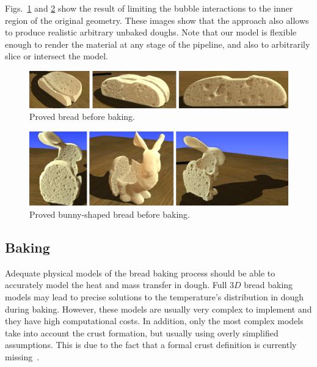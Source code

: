 Figs.~\ref{fg:proving} and \ref{fg:provingBunny} show the result of limiting the bubble interactions to the inner region of the original geometry.
These images show that the approach also allows to produce realistic arbitrary unbaked doughs.
Note that our model is flexible enough to render the material at any stage of the pipeline, and also to arbitrarily slice or intersect the model.

\begin{figure}
\includegraphics[width=13cm]{figures/prebakebread}
\caption{Proved bread before baking.}
\label{fg:proving}
\end{figure}

\begin{figure}
\includegraphics[width=13cm]{figures/prebakebunny}
\caption{Proved bunny-shaped bread before baking.}
\label{fg:provingBunny}
\end{figure}

\subsection{Baking}
Adequate physical models of the bread baking process should be able to accurately model the heat and mass transfer in dough.
Full $3D$ bread baking models may lead to precise solutions to the temperature's distribution in dough during baking.
However, these models are usually very complex to implement and they have high computational costs.
In addition, only the most complex models take into account the crust formation, but usually using overly simplified assumptions.
This is due to the fact that a formal crust definition is currently missing~\cite{Vanin2009}.

